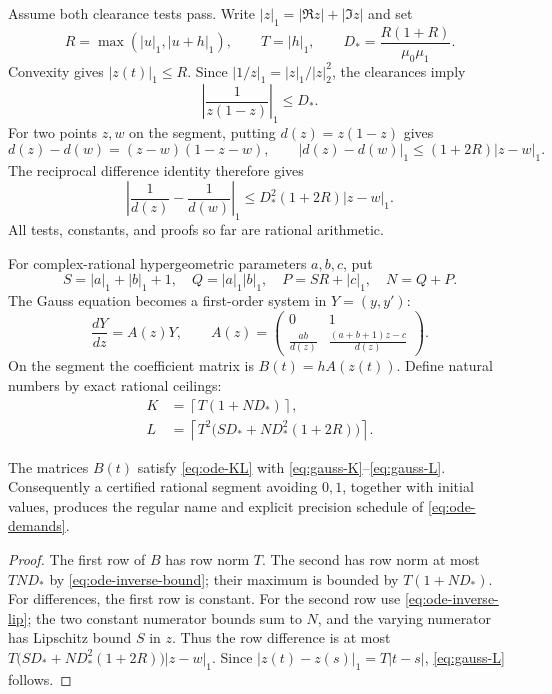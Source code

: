 Assume both clearance tests pass. Write $|z|_1=|\Re z|+|\Im z|$ and set
\[
 R=\max(|u|_1,|u+h|_1),\qquad T=|h|_1,\qquad
 D_*=\frac{R(1+R)}{\mu_0\mu_1}.
\]
Convexity gives $|z(t)|_1\le R$. Since
$|1/z|_1=|z|_1/|z|_2^2$, the clearances imply
\begin{equation}\label{eq:ode-inverse-bound}
 \left|\frac1{z(1-z)}\right|_1\le D_*.
\end{equation}
For two points $z,w$ on the segment, putting $d(z)=z(1-z)$ gives
\[
 d(z)-d(w)=(z-w)(1-z-w),\qquad
 |d(z)-d(w)|_1\le(1+2R)|z-w|_1.
\]
The reciprocal difference identity therefore gives
\begin{equation}\label{eq:ode-inverse-lip}
 \left|\frac1{d(z)}-\frac1{d(w)}\right|_1
 \le D_*^2(1+2R)|z-w|_1.
\end{equation}
All tests, constants, and proofs so far are rational arithmetic.

For complex-rational hypergeometric parameters $a,b,c$, put
\[
 S=|a|_1+|b|_1+1,\quad Q=|a|_1|b|_1,\quad
 P=SR+|c|_1,\quad N=Q+P.
\]
The Gauss equation \cite{dlmf-gauss} becomes a first-order system in $Y=(y,y')$:
\[
 \frac{dY}{dz}=A(z)Y,\qquad
 A(z)=\begin{pmatrix}
 0&1\\[1mm]
 \displaystyle\frac{ab}{d(z)}&
 \displaystyle\frac{(a+b+1)z-c}{d(z)}
 \end{pmatrix}.
\]
On the segment the coefficient matrix is $B(t)=hA(z(t))$. Define natural
numbers by exact rational ceilings:
\begin{align}
 K&=\left\lceil T(1+ND_*)\right\rceil,\label{eq:gauss-K}\\
 L&=\left\lceil T^2\bigl(SD_*+ND_*^2(1+2R)\bigr)\right\rceil.
 \label{eq:gauss-L}
\end{align}

\begin{proposition}\label{prop:gauss-transport-data}
The matrices $B(t)$ satisfy \eqref{eq:ode-KL} with
\eqref{eq:gauss-K}--\eqref{eq:gauss-L}. Consequently a certified rational
segment avoiding $0,1$, together with initial values, produces the regular
name and explicit precision schedule of \eqref{eq:ode-demands}.
\end{proposition}
\begin{proof}
The first row of $B$ has row norm $T$. The second has row norm at most
$TND_*$ by \eqref{eq:ode-inverse-bound}; their maximum is bounded by
$T(1+ND_*)$. For differences, the first row is constant. For the second
row use \eqref{eq:ode-inverse-lip}; the two constant numerator bounds sum
to $N$, and the varying numerator has Lipschitz bound $S$ in $z$.
Thus the row difference is at most
$T\bigl(SD_*+ND_*^2(1+2R)\bigr)|z-w|_1$.
Since $|z(t)-z(s)|_1=T|t-s|$, \eqref{eq:gauss-L} follows.
\end{proof}

